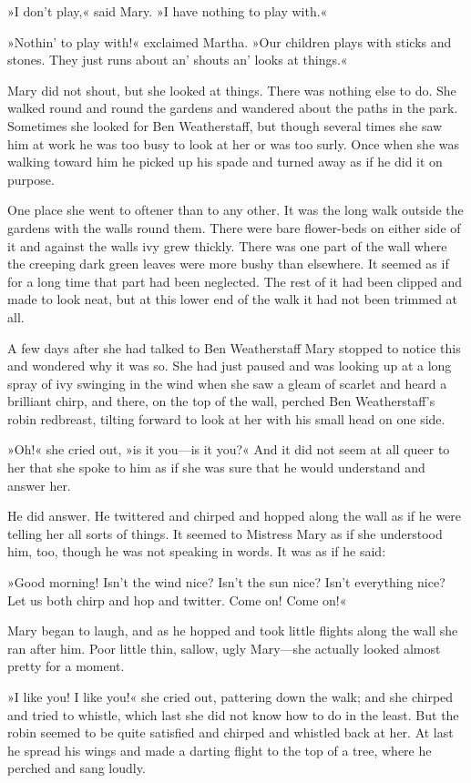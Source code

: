 »I don't play,« said Mary. »I have nothing to play with.«

»Nothin' to play with!« exclaimed Martha. »Our children plays with sticks and stones. They just runs about an' shouts an' looks at things.«

Mary did not shout, but she looked at things. There was nothing else to do. She walked round and round the gardens and wandered about the paths in the park. Sometimes she looked for Ben Weatherstaff, but though several times she saw him at work he was too busy to look at her or was too surly. Once when she was walking toward him he picked up his spade and turned away as if he did it on purpose.

One place she went to oftener than to any other. It was the long walk outside the gardens with the walls round them. There were bare flower-beds on either side of it and against the walls ivy grew thickly. There was one part of the wall where the creeping dark green leaves were more bushy than elsewhere. It seemed as if for a long time that part had been neglected. The rest of it had been clipped and made to look neat, but at this lower end of the walk it had not been trimmed at all.

A few days after she had talked to Ben Weatherstaff Mary stopped to notice this and wondered why it was so. She had just paused and was looking up at a long spray of ivy swinging in the wind when she saw a gleam of scarlet and heard a brilliant chirp, and there, on the top of the wall, perched Ben Weatherstaff's robin redbreast, tilting forward to look at her with his small head on one side.

»Oh!« she cried out, »is it you—is it you?« And it did not seem at all queer to her that she spoke to him as if she was sure that he would understand and answer her.

He did answer. He twittered and chirped and hopped along the wall as if he were telling her all sorts of things. It seemed to Mistress Mary as if she understood him, too, though he was not speaking in words. It was as if he said:

»Good morning! Isn't the wind nice? Isn't the sun nice? Isn't everything nice? Let us both chirp and hop and twitter. Come on! Come on!«

Mary began to laugh, and as he hopped and took little flights along the wall she ran after him. Poor little thin, sallow, ugly Mary—she actually looked almost pretty for a moment.

»I like you! I like you!« she cried out, pattering down the walk; and she chirped and tried to whistle, which last she did not know how to do in the least. But the robin seemed to be quite satisfied and chirped and whistled back at her. At last he spread his wings and made a darting flight to the top of a tree, where he perched and sang loudly.

